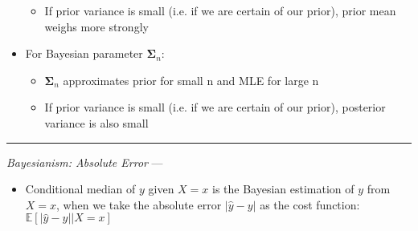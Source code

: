 \begin{itemize}
\begin{itemize}
        \item If prior variance is small (i.e. if we are certain of our prior), prior mean weighs more strongly
    \end{itemize}
    \item For Bayesian parameter $\boldsymbol{\Sigma}_n$: \begin{itemize}
        \item $\boldsymbol{\Sigma}_n$ approximates prior for small n and MLE for large n
        \item If prior variance is small (i.e. if we are certain of our prior), posterior variance is also small
    \end{itemize}
\end{itemize}

{\color{lightgray}\hrule height 0.001mm}

\emph{Bayesianism: Absolute Error} --- 
\begin{itemize}
    \item Conditional median of $y$ given $X = x$ is the Bayesian estimation of $y$ from $X = x$, when we take the absolute error $|\hat{y}-y|$ as the cost function: $\mathbb{E}[|\hat{y}-y| | X = x]$
\end{itemize}